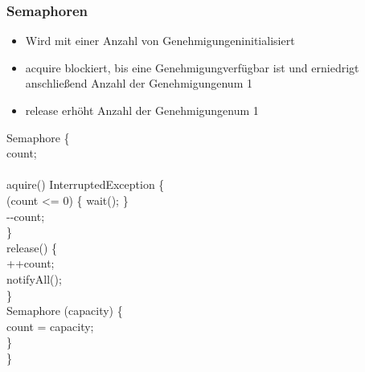 \subsubsection{Semaphoren}
\begin{itemize}
    \item Wird mit einer Anzahl von \glqq Genehmigungen\grqq initialisiert
    \item acquire blockiert, bis eine \glqq Genehmigung\grqq verfügbar ist und erniedrigt anschließend Anzahl der \glqq Genehmigungen\grqq um 1
    \item release erhöht Anzahl der \glqq Genehmigungen\grqq um 1
\end{itemize}
\null
\begin{code}
    \javaPublic \javaClass Semaphore \{\\
        \null\quad\javaPrivate \javaInt count;\\\null\\
        \null\quad    \javaPublic {} \javaVoid aquire()  \javaThrows InterruptedException \{\\
        \null\quad\quad        \javaWhile (count <= 0) \{ wait(); \}\\
        \null\quad\quad\quad            -\null-count;\\
        \null\quad    \}\\
        \null\quad\javaPublic {} \javaVoid release() \{\\
        \null\quad\quad            ++count;\\
        \null\quad\quad            notifyAll();\\
        \null\quad        \}\\
        \null\quad        \javaPublic Semaphore (\javaInt capacity) \{\\
        \null\quad\quad            count = capacity;\\
        \null\quad        \}\\
    \}
\end{code}